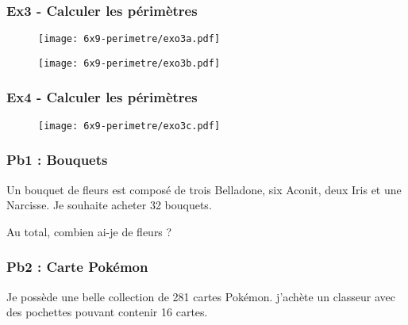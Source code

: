 \subsubsection*{Ex3 - Calculer les périmètres} 

\begin{multicols}{2}\noindent
\begin{figure}[H]
  \centering
  \texttt{[image: 6x9-perimetre/exo3a.pdf]}
\end{figure} \columnbreak

\begin{figure}[H]
  \centering
  \texttt{[image: 6x9-perimetre/exo3b.pdf]}
\end{figure} 

\end{multicols}

\Pointilles[15] 

\newpage

\subsubsection*{Ex4 - Calculer les périmètres} 

\begin{multicols}{2}\noindent

\begin{figure}[H]
  \centering
  \texttt{[image: 6x9-perimetre/exo3c.pdf]}
\end{figure} \columnbreak

\Pointilles[10] 

\end{multicols}




\subsubsection*{Pb1 : Bouquets} 

Un bouquet de fleurs est composé de trois Belladone, six Aconit, deux Iris et une Narcisse. Je souhaite acheter 32 bouquets.

Au total, combien ai-je de fleurs ?

\Pointilles[6] 


\subsubsection*{Pb2 : Carte Pokémon} 

Je possède une belle collection de 281 cartes Pokémon. j’achète un classeur avec des pochettes pouvant contenir 16 cartes.

